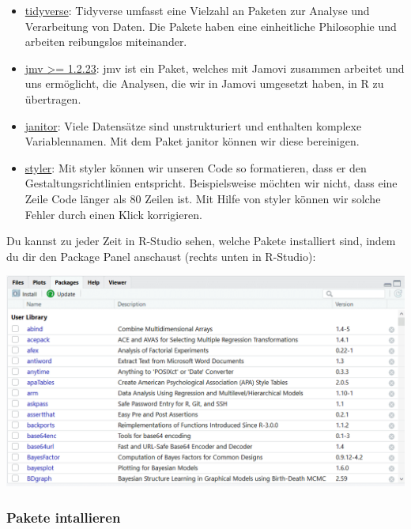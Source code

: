 \documentclass[
]{book}
\begin{document}
\begin{itemize}
\item
  \href{https://rise.articulate.com/author/SHojwTyVccfVjJhG_D37L6cXrgxGbnca\#/author/details/anYDnxw9kjDldfma4gUcOvsHCpVUSe5-}{tidyverse}: Tidyverse umfasst eine Vielzahl an Paketen zur Analyse und Verarbeitung von Daten. Die Pakete haben eine einheitliche Philosophie und arbeiten reibungslos miteinander.
\item
  \href{https://cran.r-project.org/web/packages/jmv/index.html}{jmv \textgreater= 1.2.23}: jmv ist ein Paket, welches mit Jamovi zusammen arbeitet und uns ermöglicht, die Analysen, die wir in Jamovi umgesetzt haben, in R zu übertragen.
\item
  \href{https://github.com/sfirke/janitor}{janitor}: Viele Datensätze sind unstrukturiert und enthalten komplexe Variablennamen. Mit dem Paket janitor können wir diese bereinigen.
\item
  \href{https://github.com/r-lib/styler}{styler}: Mit styler können wir unseren Code so formatieren, dass er den Gestaltungsrichtlinien entspricht. Beispielsweise möchten wir nicht, dass eine Zeile Code länger als 80 Zeilen ist. Mit Hilfe von styler können wir solche Fehler durch einen Klick korrigieren.
\end{itemize}

Du kannst zu jeder Zeit in R-Studio sehen, welche Pakete installiert sind, indem du dir den Package Panel anschaust (rechts unten in R-Studio):

\includegraphics{images/02_grundlagen/pakete.png}

\hypertarget{pakete-intallieren}{%
\subsubsection{Pakete intallieren}\label{pakete-intallieren}}
\end{document}

